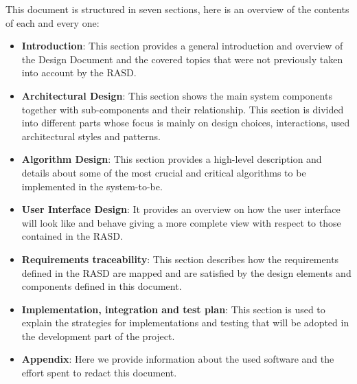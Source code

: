 This document is structured in seven sections, here is an overview of the contents of each and every one:
\begin{itemize}
	\item \textbf{Introduction}: 
This section provides a general introduction and overview of the Design Document and the covered topics that were not previously taken into account by the RASD. 
	\item \textbf{Architectural Design}:
	This section shows the main system components together with sub-components and their relationship. 
	This section is divided into different parts whose focus is mainly on design choices, interactions, used architectural styles and patterns.  
	\item \textbf{Algorithm Design}: 
This section provides a high-level description and details about some of the most crucial and critical algorithms to be implemented in the system-to-be. 
	\item \textbf{User Interface Design}: 
 It provides an overview on how the user interface will look like and behave giving a more complete view with respect to those contained in the RASD. 
	\item \textbf{Requirements traceability}: 
This section describes how the requirements defined in the RASD are mapped and are satisfied by the design elements and components defined in this document. 
	\item \textbf{Implementation, integration and test plan}: 
This section is used to explain the strategies for implementations and testing that will be adopted in the development part of the project.
\item \textbf{Appendix}: 
Here we provide information about the used software and the effort spent to redact this document. 
\end{itemize}